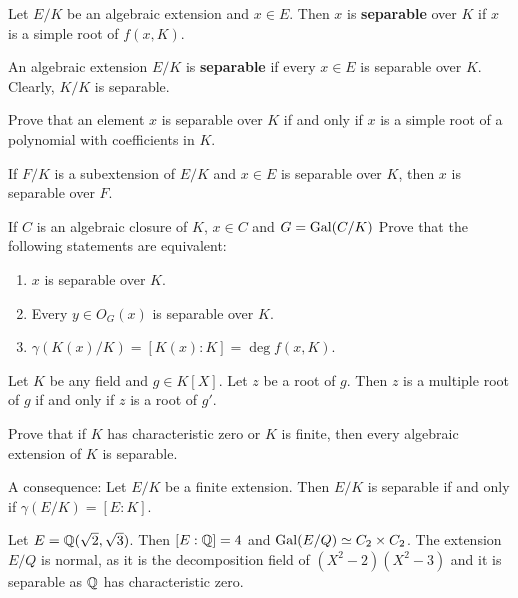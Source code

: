 
\begin{definition}
    Let $E/K$ be an algebraic extension and $x\in E$. Then
    $x$ is \textbf{separable} over $K$ if $x$ is a simple root
    of $f(x,K)$. 
\end{definition}

An algebraic extension $E/K$ is \textbf{separable} 
if every $x\in E$ is separable over $K$. Clearly, $K/K$ is separable. 

\begin{exercise}
    Prove that 
    an element $x$ is separable over $K$ if and only if $x$ is a simple root
    of a polynomial with coefficients in $K$. 
\end{exercise}

If $F/K$ is a subextension of $E/K$ and $x\in E$ is separable over $K$, then
$x$ is separable over $F$. 

\begin{exercise}
     If $C$ is an algebraic closure of $K$, $x\in C$ and $G=\operatorname{Gal}(C/K)$
    Prove that the following statements are equivalent:
    \begin{enumerate}
        \item $x$ is separable over $K$.
        \item Every $y\in O_G(x)$ is separable over $K$.
        \item $\gamma(K(x)/K)=[K(x):K]=\deg f(x,K)$. 
    \end{enumerate}
\end{exercise}

Let $K$ be any field and $g\in K[X]$. Let $z$ be a root of $g$. 
Then $z$ is a multiple root of $g$ if and only if $z$ is a root of $g'$. 

\begin{exercise}
Prove that if $K$ has characteristic zero or $K$ is finite, then 
every algebraic extension of $K$ is separable. 
\end{exercise}

A consequence: 
Let $E/K$ be a finite extension. Then $E/K$ is separable
if and only if $\gamma(E/K)=[E:K]$. 

\begin{example}
    Let $E=\mathbb{Q}(\sqrt{2},\sqrt{3})$. Then 
    $[E:\mathbb{Q}]=4$ and 
    $\operatorname{Gal}(E/Q)\simeq C_2\times C_2$. The extension $E/Q$ is normal, 
    as it is the decomposition field of $(X^2-2)(X^2-3)$ and 
    it is separable as $\mathbb{Q}$ has characteristic zero. 
\end{example}

